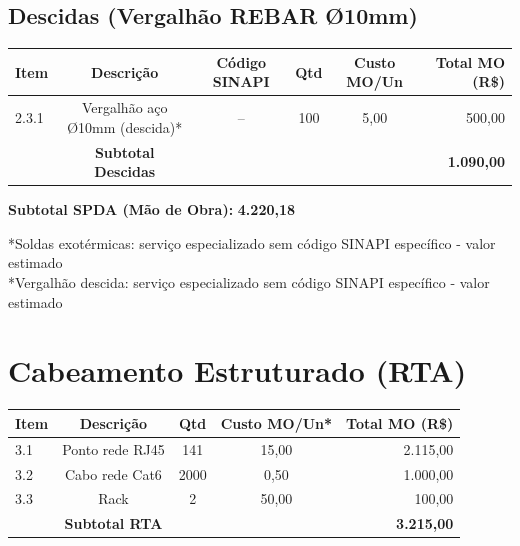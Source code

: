 \documentclass[12pt,a4paper]{article}
\renewenvironment{table}%
{\begin{center}%
\scriptsize%
\addtolength{\tabcolsep}{-2pt}%
}%
{\end{center}}
\begin{document}
\subsection{Descidas (Vergalhão REBAR Ø10mm)}

\begin{table}
\centering
\begin{tabular}{lccccr}
\toprule
\textbf{Item} & \textbf{Descrição} & \textbf{Código SINAPI} & \textbf{Qtd} & \textbf{Custo MO/Un} & \textbf{Total MO (R\$)} \\
\midrule
2.3.1 & Vergalhão aço Ø10mm (descida)* & -- & 100 & 5,00 & 500,00 \\
\midrule
 & \textbf{Subtotal Descidas} & & & & \textbf{1.090,00} \\
\bottomrule
\end{tabular}
\end{table}

\noindent\textbf{Subtotal SPDA (Mão de Obra):} \textbf{4.220,18}

\noindent\small{*Soldas exotérmicas: serviço especializado sem código SINAPI específico - valor estimado} \\
\noindent\small{*Vergalhão descida: serviço especializado sem código SINAPI específico - valor estimado}

\pagebreak

\section{Cabeamento Estruturado (RTA)}

\begin{table}
\centering
\begin{tabular}{lcccr}
\toprule
\textbf{Item} & \textbf{Descrição} & \textbf{Qtd} & \textbf{Custo MO/Un*} & \textbf{Total MO (R\$)} \\
\midrule
3.1 & Ponto rede RJ45 & 141 & 15,00 & 2.115,00 \\
3.2 & Cabo rede Cat6 & 2000 & 0,50 & 1.000,00 \\
3.3 & Rack & 2 & 50,00 & 100,00 \\
\midrule
 & \textbf{Subtotal RTA} & & & \textbf{3.215,00} \\
\bottomrule
\end{tabular}
\end{table}
\end{document}
